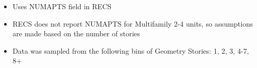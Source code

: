 \begin{itemize}
\item Uses NUMAPTS field in RECS
\item RECS does not report NUMAPTS for Multifamily 2-4 units, so assumptions are made based on the number of stories
\item Data was sampled from the following bins of Geometry Stories: 1, 2, 3, 4-7, 8+
\end{itemize}
